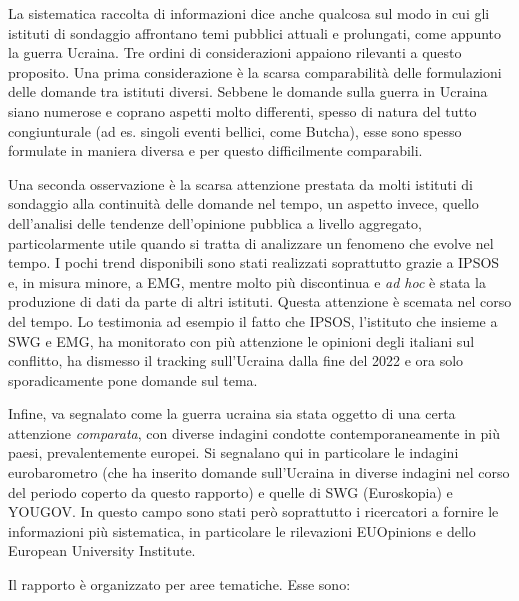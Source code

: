 \documentclass[
]{book}
\begin{document}
La sistematica raccolta di informazioni dice anche qualcosa sul modo in cui gli istituti di sondaggio affrontano temi pubblici attuali e prolungati, come appunto la guerra Ucraina. Tre ordini di considerazioni appaiono rilevanti a questo proposito. Una prima considerazione è la scarsa comparabilità delle formulazioni delle domande tra istituti diversi. Sebbene le domande sulla guerra in Ucraina siano numerose e coprano aspetti molto differenti, spesso di natura del tutto congiunturale (ad es. singoli eventi bellici, come Butcha), esse sono spesso formulate in maniera diversa e per questo difficilmente comparabili.

Una seconda osservazione è la scarsa attenzione prestata da molti istituti di sondaggio alla continuità delle domande nel tempo, un aspetto invece, quello dell'analisi delle tendenze dell'opinione pubblica a livello aggregato, particolarmente utile quando si tratta di analizzare un fenomeno che evolve nel tempo. I pochi trend disponibili sono stati realizzati soprattutto grazie a IPSOS e, in misura minore, a EMG, mentre molto più discontinua e \emph{ad hoc} è stata la produzione di dati da parte di altri istituti. Questa attenzione è scemata nel corso del tempo. Lo testimonia ad esempio il fatto che IPSOS, l'istituto che insieme a SWG e EMG, ha monitorato con più attenzione le opinioni degli italiani sul conflitto, ha dismesso il tracking sull'Ucraina dalla fine del 2022 e ora solo sporadicamente pone domande sul tema.

Infine, va segnalato come la guerra ucraina sia stata oggetto di una certa attenzione \emph{comparata}, con diverse indagini condotte contemporaneamente in più paesi, prevalentemente europei. Si segnalano qui in particolare le indagini eurobarometro (che ha inserito domande sull'Ucraina in diverse indagini nel corso del periodo coperto da questo rapporto) e quelle di SWG (Euroskopia) e YOUGOV. In questo campo sono stati però soprattutto i ricercatori a fornire le informazioni più sistematica, in particolare le rilevazioni EUOpinions e dello European University Institute.

Il rapporto è organizzato per aree tematiche. Esse sono:
\end{document}
